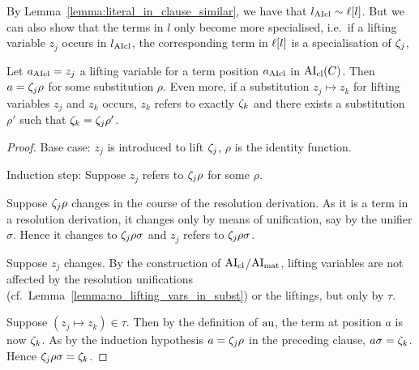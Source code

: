 \documentclass[,%
	paper=a4,%
	DIV12, %
	twoside=false,%
	liststotoc,
	bibtotoc,
	draft=false,%
	numbers=noendperiod
]{scrartcl}
\begin{document}
By Lemma~\ref{lemma:literal_in_clause_similar}, we have that $l_{\operatorname{AIcl}} \sim \ell[l]$.
But we can also show that the terms in $l$ only become more specialised, i.e.\ if a lifting variable $z_j$ occurs in $l_{\operatorname{AIcl}}$, the corresponding term in $\ell[l]$ is a specialisation of $\zeta_{j}$, 
\begin{lemma}
	\label{lemma:lifting_var_refers_to_abstraction_of_term}
	Let $a_{\operatorname{AIcl}} = z_j$ a lifting variable for a term position $a_{\operatorname{AIcl}}$ in $\operatorname{AI}_\mathrm{cl}(C)$. Then $a = \zeta_{j}\rho$ for some substitution $\rho$.
	Even more, if a substitution $z_j\mapsto z_k$ for lifting variables $z_j$ and $z_k$ occurs,
	$z_k$ refers to exactly $\zeta_{k}$ and there exists a substitution $\rho'$ such that $\zeta_{k} = \zeta_{j}\rho'$.
\end{lemma}
\begin{proof}
	Base case:
	$z_j$ is introduced to lift $\zeta_{j}$, $\rho$ is the identity function.

	Induction step:
	Suppose $z_j$ refers to $\zeta_{j}\rho$ for some $\rho$.

	Suppose $\zeta_{j}\rho$ changes in the course of the resolution derivation.
	As it is a term in a resolution derivation, it changes only by means of unification, say by the unifier $\sigma$.
	Hence it changes to $\zeta_{j}\rho\sigma$ and $z_j$ refers to $\zeta_{j}\rho\sigma$.

	Suppose $z_j$ changes. By the construction of $\operatorname{AI}_\mathrm{cl}$/$\operatorname{AI}_\mathrm{mat}$, lifting variables are not affected by the resolution unifications (cf.\ Lemma~\ref{lemma:no_lifting_vars_in_subst}) or the liftings, but only by $\tau$.

	Suppose $(z_j\mapsto z_k)\in \tau$.
	Then by the definition of $\operatorname{au}$, the term at position $a$ is now $\zeta_{k}$. 
	As by the induction hypothesis $a = \zeta_{j}\rho$ in the preceding clause, $a\sigma = \zeta_{k}$.
	Hence $\zeta_{j}\rho\sigma = \zeta_{k}$.
\end{proof}
\end{document}

